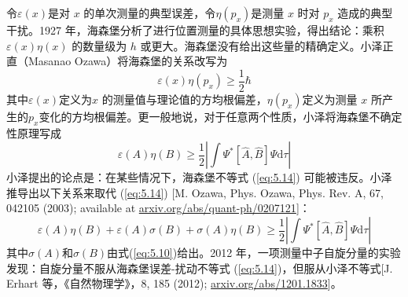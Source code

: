     令$\varepsilon\left(x\right)$是对 $x$ 的单次测量的典型误差，令$\eta \left(p_x\right)$是测量 $x$ 时对 $p_x$ 造成的典型干扰。1927 年，海森堡分析了进行位置测量的具体思想实验，得出结论：乘积 $\varepsilon\left(x\right)\eta\left(x\right)$ 的数量级为 $h$ 或更大。海森堡没有给出这些量的精确定义。小泽正直（Masanao Ozawa）将海森堡的关系改写为
    \begin{equation*}
        \varepsilon\left(x\right)\eta\left(p_x\right) \ge \frac{1}{2}\hbar
    \end{equation*}
    其中$\varepsilon\left(x\right)$定义为$x$ 的测量值与理论值的方均根偏差，$\eta\left(p_x\right)$定义为测量 $x$ 所产生的$p_x$变化的方均根偏差。更一般地说，对于任意两个性质，小泽将海森堡不确定性原理写成
    \begin{equation}
        \varepsilon\left(A\right)\eta\left(B\right) \ge \frac{1}{2}\left|\int \Psi^{\ast}\left[\hat{A},\hat{B}\right]\Psi\mathrm{d}\tau\right|
        \label{eq:5.14}
    \end{equation}
    小泽提出的论点是：在某些情况下，海森堡不等式 (\ref{eq:5.14}) 可能被违反。小泽推导出以下关系来取代 (\ref{eq:5.14}) [M. Ozawa, Phys. Ozawa, Phys. Rev. A, 67, 042105 (2003); available at \url{arxiv.org/abs/quant-ph/0207121}]：
    \begin{equation*}
        \varepsilon\left(A\right)\eta\left(B\right) + \varepsilon\left(A\right)\sigma\left(B\right) + \sigma\left(A\right)\eta\left(B\right) \ge \frac{1}{2}\left|\int \Psi^{\ast}\left[\hat{A},\hat{B}\right]\Psi\mathrm{d}\tau\right|
    \end{equation*}
    其中$\sigma\left(A\right)$和$\sigma\left(B\right)$由式(\ref{eq:5.10})给出。2012 年，一项测量中子自旋分量的实验发现：自旋分量不服从海森堡误差-扰动不等式 (\ref{eq:5.14})，但服从小泽不等式[J. Erhart 等，《自然物理学》，8, 185 (2012); \url{arxiv.org/abs/1201.1833}]。

